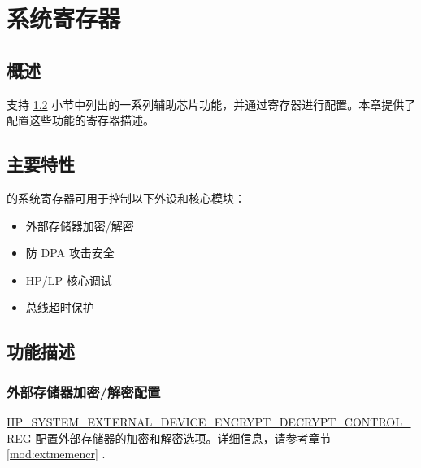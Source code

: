 \documentclass[main\_\_CN.tex]{subfiles}
\begin{document}

\ifglobal
\else
    {\let\clearpage\relax \listoftodos}
    \tableofcontents
\fi



\chapter{系统寄存器}
\label{mod:sysreg}
\hypertarget{sysreg}{}

\section{概述}

\chipname{} 支持 \ref{sec:sysreg-features} \textit{} 小节中列出的一系列辅助芯片功能，并通过寄存器进行配置。本章提供了配置这些功能的寄存器描述。

\section{主要特性}
\label{sec:sysreg-features}

\chipname{} 的系统寄存器可用于控制以下外设和核心模块：

\begin{itemize}
    \item 外部存储器加密/解密
    \item 防 DPA 攻击安全
    \item HP/LP 核心调试
    \item 总线超时保护
\end{itemize}


\section{功能描述}

\subsection{外部存储器加密/解密配置}

\hyperref[regdesc:HPSYSTEMEXTERNALDEVICEENCRYPTDECRYPTCONTROLREG]{HP\_SYSTEM\_EXTERNAL\_DEVICE\_ENCRYPT\_DECRYPT\_CONTROL\_REG} 配置外部存储器的加密和解密选项。详细信息，请参考章节 \ref{mod:extmemencr} \textit{}.
\end{document}

